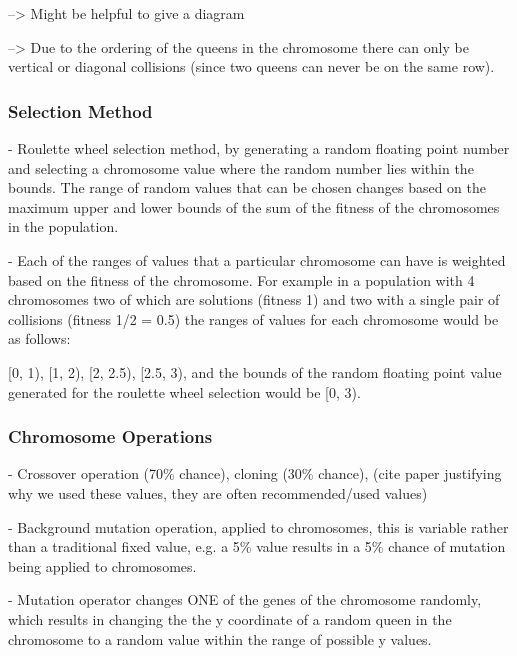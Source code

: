 \documentclass{sig-alternate}
\begin{document}
  --> Might be helpful to give a diagram

  --> Due to the ordering of the queens in the chromosome there can only be vertical or diagonal
      collisions (since two queens can never be on the same row).


\subsubsection{Selection Method}
- Roulette wheel selection method, by generating a random floating point number and selecting
  a chromosome value where the random number lies within the bounds. The range
  of random values that can be chosen changes based on the maximum upper and lower
  bounds of the sum of the fitness of the chromosomes in the population.

- Each of the ranges of values that a particular chromosome can have is weighted
  based on the fitness of the chromosome. For example in a population with 4
  chromosomes two of which are solutions (fitness 1) and two with a single pair of collisions
  (fitness 1/2 = 0.5) the ranges of values for each chromosome would be as
  follows:

  [0, 1), [1, 2), [2, 2.5), [2.5, 3), and the bounds of the random floating point value
  generated for the roulette wheel selection would be [0, 3).


\subsubsection{Chromosome Operations}
- Crossover operation (70\% chance), cloning (30\% chance), (cite paper justifying why
  we used these values, they are often recommended/used values)

- Background mutation operation, applied to chromosomes, this is variable rather
  than a traditional fixed value, e.g. a 5\% value results in a 5\% chance of
  mutation being applied to chromosomes.

- Mutation operator changes ONE of the genes of the chromosome randomly, which
  results in changing the the y coordinate of a random queen in the chromosome 
  to a random value within the range of possible y values.
\end{document}
